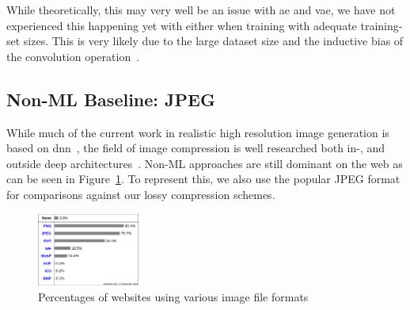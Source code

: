 While theoretically, this may very well be an issue with \ac{ae} and \ac{vae}, we have not experienced this happening
yet with either when training with adequate training-set sizes.
This is very likely due to the large dataset size and the inductive bias of the convolution operation~\cite{citationNeeded}.

\subsection{Non-ML Baseline: JPEG}\label{subsec:jpeg}
While much of the current work in realistic high resolution image generation is based on \ac{dnn}~\cite{citationNeeded},
the field of image compression is well researched both in-, and outside deep architectures~\cite{compression}.
Non-ML approaches are still dominant on the web as can be seen in Figure~\ref{fig:file_formats}.
To represent this, we also use the popular JPEG format for comparisons against our lossy compression schemes.

\begin{figure}[H]
    \centering
    \includegraphics[width=0.3\textwidth]{images/formats}
    \caption{Percentages of websites using various image file formats~\cite{img_file_format}}
    \label{fig:file_formats}
\end{figure}